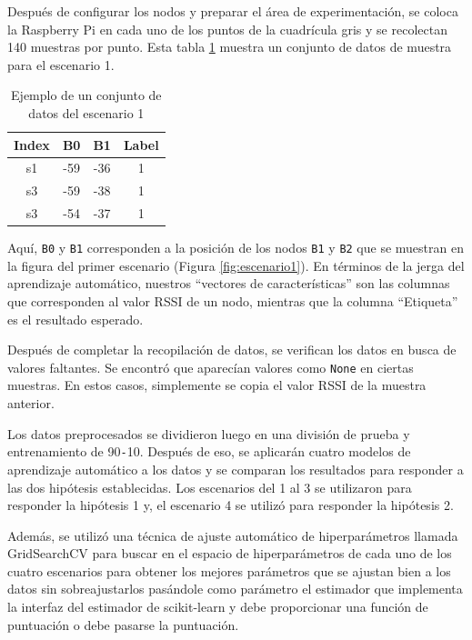 Después de configurar los nodos y preparar el área de experimentación, se coloca la Raspberry Pi en cada uno de los puntos de la cuadrícula gris y se recolectan 140 muestras por punto. Esta tabla \ref{cuadro:tabla1} muestra un conjunto de datos de muestra para el escenario 1.


\begin{table}[H]
\begin{center}
\begin{tabular}{|c|c|c|c|}
\hline
\textbf{Index} & \textbf{B0} & \textbf{B1} & \textbf{Label}  \\
\hline
s1 & -59 & -36 & 1 \\  
s3 & -59 & -38 & 1 \\   
s3 & -54 & -37 & 1 \\   
\hline
\end{tabular}
\caption{Ejemplo de un conjunto de datos del escenario 1}
\label{cuadro:tabla1}
\end{center}
\end{table}


Aquí, \texttt{B0} y \texttt{B1} corresponden a la posición de los nodos \texttt{B1} y \texttt{B2} que se muestran en la figura del primer escenario (Figura \ref{fig:escenario1}). En términos de la jerga del aprendizaje automático, nuestros “vectores de características” son las columnas que corresponden al valor RSSI de un nodo, mientras que la columna “Etiqueta” es el resultado esperado.

Después de completar la recopilación de datos, se verifican los datos en busca de valores faltantes. Se encontró que aparecían valores como \texttt{None} en ciertas muestras. En estos casos, simplemente se copia el valor RSSI de la muestra anterior.

Los datos preprocesados se dividieron luego en una división de prueba y entrenamiento de 90\texttt{-}10. Después de eso, se aplicarán cuatro modelos de aprendizaje automático a los datos y se comparan los resultados para responder a las dos hipótesis establecidas. Los escenarios del 1 al 3 se utilizaron para responder la hipótesis 1 y, el escenario 4 se utilizó para responder la hipótesis 2.

Además, se utilizó una técnica de ajuste automático de hiperparámetros llamada GridSearchCV para buscar en el espacio de hiperparámetros de cada uno de los cuatro escenarios para obtener los mejores parámetros que se ajustan bien a los datos sin sobreajustarlos pasándole como parámetro el estimador que implementa la interfaz del estimador de scikit-learn y debe proporcionar una función de puntuación o debe pasarse la puntuación.

